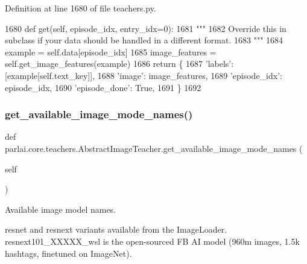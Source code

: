 Definition at line 1680 of file teachers.\+py.


\begin{DoxyCode}
1680     \textcolor{keyword}{def }get(self, episode\_idx, entry\_idx=0):
1681         \textcolor{stringliteral}{"""}
1682 \textcolor{stringliteral}{        Override this in subclass if your data should be handled in a different format.}
1683 \textcolor{stringliteral}{        """}
1684         example = self.data[episode\_idx]
1685         image\_features = self.get\_image\_features(example)
1686         \textcolor{keywordflow}{return} \{
1687             \textcolor{stringliteral}{'labels'}: [example[self.text\_key]],
1688             \textcolor{stringliteral}{'image'}: image\_features,
1689             \textcolor{stringliteral}{'episode\_idx'}: episode\_idx,
1690             \textcolor{stringliteral}{'episode\_done'}: \textcolor{keyword}{True},
1691         \}
1692 
\end{DoxyCode}
\mbox{\label{classparlai_1_1core_1_1teachers_1_1AbstractImageTeacher_ab64513ca6c2b1c358f180ee0846b26e0}} 
\subsubsection{\texorpdfstring{get\+\_\+available\+\_\+image\+\_\+mode\+\_\+names()}{get\_available\_image\_mode\_names()}}
{\footnotesize\ttfamily def parlai.\+core.\+teachers.\+Abstract\+Image\+Teacher.\+get\+\_\+available\+\_\+image\+\_\+mode\+\_\+names (\begin{DoxyParamCaption}\item[{}]{self }\end{DoxyParamCaption})}

\begin{DoxyVerb}Available image model names.

resnet and resnext variants available from the ImageLoader. resnext101_XXXXX_wsl
is the open-sourced FB AI model (960m images, 1.5k hashtags, finetuned on
ImageNet).
\end{DoxyVerb}
 

